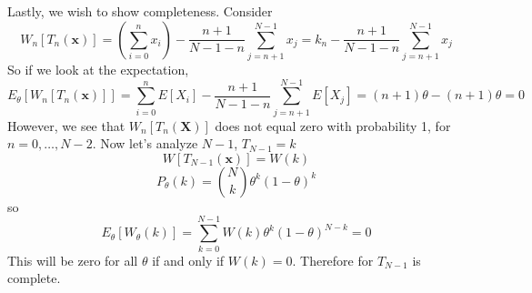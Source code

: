 \documentclass[a4paper]{article}
\begin{document}
Lastly, we wish to show completeness. Consider 
\[
  W_n[T_n(\bm{x})] = \left( \sum_{i=0}^n x_i \right) - \frac{n+1}{N-1-n} \sum_{j=n+1}^{N-1}x_j = k_n - \frac{n+1}{N-1-n} \sum_{j=n+1}^{N-1} x_j
\]
So if we look at the expectation,
\[
  E_{\theta} \left[ W_n[T_n(\bm{x})] \right] = \sum_{i=0}^n E[X_i] - \frac{n+1}{N-1-n} \sum_{j = n+1}^{N-1} E[X_j] = (n+1)\theta - (n+1)\theta  = 0
\]
However, we see that $W_n[T_n(\bm{X})]$ does not equal zero with probability 1, for $n = 0, \dots, N-2$. Now let's analyze $N-1$, $T_{N-1} = k$
\[
  W[T_{N-1}(\bm{x})] = W(k)
\]
\[
  P_{\theta}(k) = {N \choose k} \theta^k(1-\theta)^k
\]
so
\[
  E_{\theta} [W_\theta(k)] = \sum_{k=0}^{N-1} W(k) \theta^k(1-\theta)^{N-k} = 0
\]
This will be zero for all $\theta$ if and only if $W(k) = 0$. Therefore for $T_{N-1}$ is complete.
\end{document}
